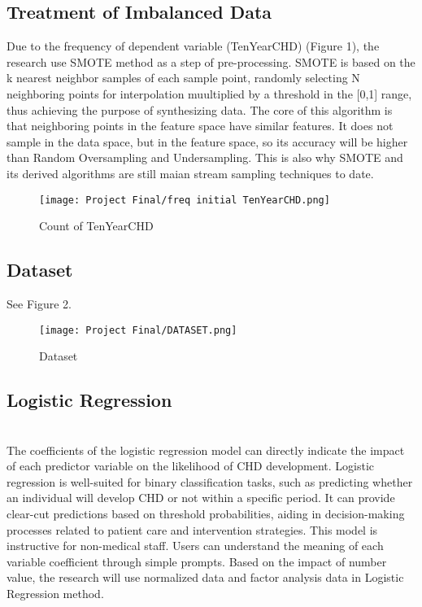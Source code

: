 \documentclass[11pt]{article}
\begin{document}
\subsection{Treatment of Imbalanced Data}
\text 
Due to the frequency of dependent variable (TenYearCHD) (Figure 1), the research use SMOTE method as a step of pre-processing. SMOTE is based on the k nearest neighbor samples of each sample point, randomly selecting N neighboring points for interpolation muultiplied by a threshold in the [0,1] range, thus achieving the purpose of synthesizing data. The core of this algorithm is that neighboring points in the feature space have similar features. It does not sample in the data space, but in the feature space, so its accuracy will be higher than Random Oversampling and Undersampling. This is also why SMOTE and its derived algorithms are still maian stream sampling techniques to date. 
\begin{figure}[h]
    \centering
    \texttt{[image: Project Final/freq initial TenYearCHD.png]}
    \caption{Count of TenYearCHD}
    \label{fig:Dataset List}
\end{figure}
\subsection{Dataset}
See Figure 2.
\begin{figure}[h]
    \centering
    \texttt{[image: Project Final/DATASET.png]}
    \caption{Dataset}
    \label{fig:enter-label}
\end{figure}
\subsection{Logistic Regression}\\
\text The coefficients of the logistic regression model can directly indicate the impact of each predictor variable on the likelihood of CHD development. Logistic regression is well-suited for binary classification tasks, such as predicting whether an individual will develop CHD or not within a specific period. It can provide clear-cut predictions based on threshold probabilities, aiding in decision-making processes related to patient care and intervention strategies. This model is instructive for non-medical staff. Users can understand the meaning of each variable coefficient through simple prompts. Based on the impact of number value, the research will use normalized data and factor analysis data in Logistic Regression method. 
\end{document}
